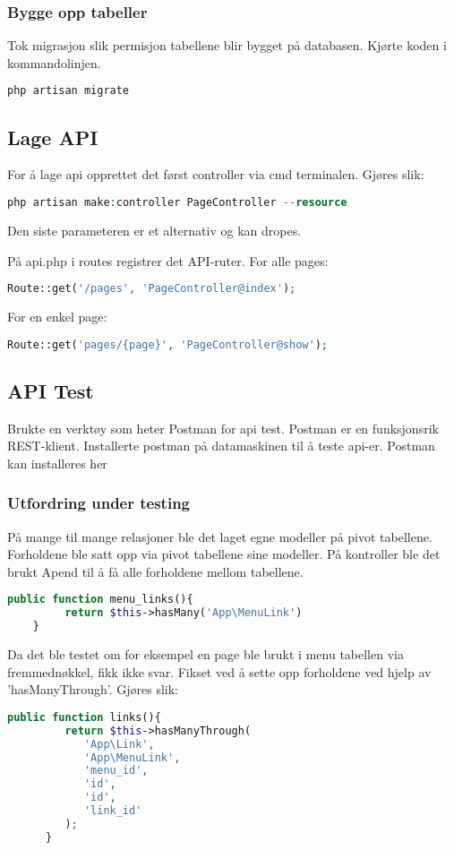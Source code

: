 \subsubsection{Bygge opp tabeller}
Tok migrasjon slik permisjon tabellene blir bygget på databasen.
Kjørte koden i kommandolinjen.
\begin{lstlisting}[language=PHP]
  php artisan migrate
\end{lstlisting}

\subsection{Lage API}
For å lage api opprettet det først controller\cite{laravel2019c} via cmd terminalen.
Gjøres slik:
\begin{lstlisting}[language=PHP]
    php artisan make:controller PageController --resource
\end{lstlisting}
Den siste parameteren  er et alternativ og kan dropes.

På api.php i routes\cite{laravel2019r} registrer det API-ruter.
For alle pages:
\begin{lstlisting}[language=PHP]
    Route::get('/pages', 'PageController@index');
\end{lstlisting} 
For en enkel page:
\begin{lstlisting}[language=PHP]
    Route::get('pages/{page}', 'PageController@show');
\end{lstlisting}

\subsection{API Test}
Brukte en verktøy som heter Postman for api test. Postman er en funksjonsrik REST-klient\cite{Rathod2017ITP}. Installerte postman på datamaskinen til å teste api-er. Postman kan installeres her\cite{postman2019tocap}
\subsubsection{Utfordring under testing} 
På mange til mange relasjoner ble  det laget egne modeller på pivot tabellene.
Forholdene ble satt opp via pivot tabellene sine modeller. På kontroller ble det brukt  Apend til å få alle forholdene mellom tabellene. 
\begin{lstlisting}[language=PHP]
    public function menu_links(){
         return $this->hasMany('App\MenuLink')
    }
\end{lstlisting}
Da det ble testet om for eksempel en page ble brukt i menu tabellen via fremmednøkkel, fikk ikke svar.
Fikset ved å sette opp forholdene ved hjelp av 'hasManyThrough'. Gjøres slik:
\begin{lstlisting}[language=PHP]
    public function links(){
         return $this->hasManyThrough(    
            'App\Link',
            'App\MenuLink',
            'menu_id',
            'id',
            'id',
            'link_id'
         );
      }
\end{lstlisting}

